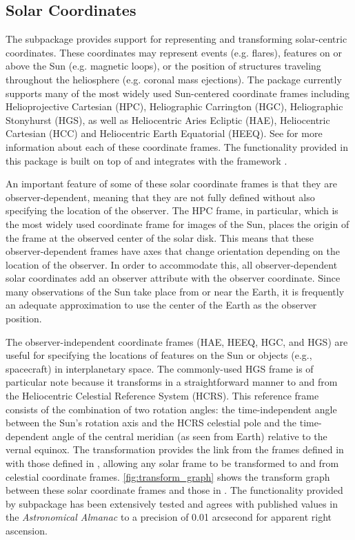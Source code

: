 \subsection{Solar Coordinates}
\label{sec:coords}

The  subpackage provides support for representing and transforming solar-centric coordinates.
These coordinates may represent events (e.g. flares), features on or above the Sun (e.g. magnetic loops), or the position of structures traveling throughout the heliosphere (e.g. coronal mass ejections).
The package currently supports many of the most widely used Sun-centered coordinate frames including Helioprojective Cartesian (HPC), Heliographic Carrington (HGC), Heliographic Stonyhurst (HGS),  as well as Heliocentric Aries Ecliptic (HAE), Heliocentric Cartesian (HCC) and Heliocentric Earth Equatorial (HEEQ).
See \citet{2006A&A...449..791T} for more information about each of these coordinate frames.
The functionality provided in this package is built on top of and integrates with the  framework \citep[see Section 3.3 of][]{astropy2018}.

An important feature of some of these solar coordinate frames is that they are observer-dependent, meaning that they are not fully defined without also specifying the location of the observer.
The HPC frame, in particular, which is the most widely used coordinate frame for images of the Sun, places the origin of the frame at the observed center of the solar disk.
This means that these observer-dependent frames have axes that change orientation depending on the location of the observer.
In order to accommodate this, all observer-dependent solar coordinates add an observer attribute with the observer coordinate.
Since many observations of the Sun take place from or near the Earth, it is frequently an adequate approximation to use the center of the Earth as the observer position.

The observer-independent coordinate frames (HAE, HEEQ, HGC, and HGS) are useful for specifying the locations of features on the Sun or objects (e.g., spacecraft) in interplanetary space.
The commonly-used HGS frame is of particular note because it transforms in a straightforward manner to and from the Heliocentric Celestial Reference System (HCRS).
This reference frame consists of the combination of two rotation angles: the time-independent angle between the Sun's rotation axis and the HCRS celestial pole \citep[see][]{2007CeMDA..98..155S} and the time-dependent angle of the central meridian (as seen from Earth) relative to the vernal equinox.
The transformation provides the link from the frames defined in  with those defined in , allowing any solar frame to be transformed to and from celestial coordinate frames.
\autoref{fig:transform_graph} shows the transform graph between these solar coordinate frames and those in \astropy.
The functionality provided by  subpackage has been extensively tested and agrees with published values in the \textit{Astronomical Almanac} to a precision of 0.01 arcsecond for apparent right ascension.


